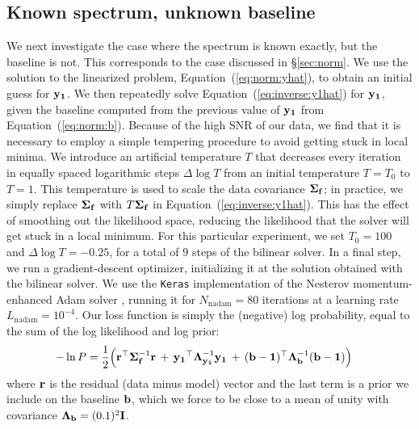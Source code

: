 \documentclass[modern]{aastex631}
\begin{document}
\subsection{Known spectrum, unknown baseline}
\label{sec:spot_y1b}
%
We next investigate the case where the spectrum is known exactly, but the baseline is not. 
This corresponds to the case discussed in
\S\ref{sec:norm}. 
We use the solution to the linearized problem, Equation~(\ref{eq:norm:yhat}), to obtain an initial guess for ${\mathbf{y_1}}$. 
We then repeatedly solve Equation~(\ref{eq:inverse:y1hat}) for ${\mathbf{y_1}}$, given the baseline computed from the previous value of ${\mathbf{y_1}}$ from Equation~(\ref{eq:norm:b}).
Because of the high SNR of our data, we find that it is necessary to employ a simple tempering procedure to avoid getting stuck in local minima. 
We introduce an artificial temperature $T$ that decreases every iteration in equally spaced logarithmic steps $\Delta \log T$ from an initial temperature $T=T_0$ to $T=1$. 
This temperature is used to scale the data covariance $\boldsymbol{\Sigma}_{\mathbf{f}}$; in practice, we simply replace $\boldsymbol{\Sigma}_{\mathbf{f}}$ with $T \boldsymbol{\Sigma}_{\mathbf{f}}$ in Equation~(\ref{eq:inverse:y1hat}). 
This has the effect of smoothing out the likelihood space, reducing the likelihood that the solver will get stuck in a local minimum. 
For this particular experiment, we set $T_0 = 100$ and $\Delta \log T = -0.25$, for a total of $9$ steps of the bilinear solver.
%
In a final step, we run a gradient-descent optimizer, initializing it at the solution obtained with the bilinear solver. 
We use the \texttt{Keras} \citep{Keras} implementation of the Nesterov momentum-enhanced Adam solver \citep[\texttt{NAdam};][]{NAdam}, running it for $N_\mathrm{nadam} = 80$ iterations at a learning rate $L_\mathrm{nadam} = 10^{-4}$. 
Our loss function is simply the (negative) log probability, equal to the sum of the log likelihood and log prior:
%
\begin{align}
    \label{eq:spotstar:logP}
    -\ln P & =
    \frac{1}{2}
    \Big(
    {\mathbf{r}}^\top \boldsymbol{\Sigma}_{\mathbf{f}}^{-1} {\mathbf{r}} \, + \,
    {\mathbf{y_1}}^\top \boldsymbol{\Lambda}_{\mathbf{y_1}}^{-1} {\mathbf{y_1}} \, + \, ({\mathbf{b - 1}})^\top \boldsymbol{\Lambda}_{\mathbf{b}}^{-1} ({\mathbf{b - 1}})
    \Big)
\end{align}
%
where ${\mathbf{r}}$ is the residual (data minus model) vector and the last term is a prior we include on the baseline ${\mathbf{b}}$, which we force to be close to a mean of unity with covariance $\boldsymbol{\Lambda}_{\mathbf{b}} = (0.1)^2{\mathbf{I}}$.
\end{document}
